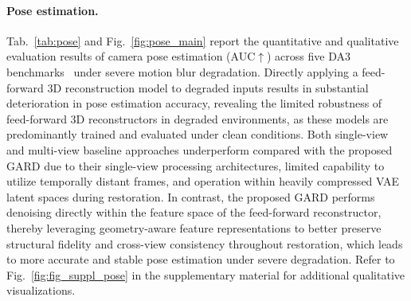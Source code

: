 \documentclass{llmxive}
\providecommand{\ourmodel}{GARD\xspace}
\begin{document}
\paragraph{Pose estimation.}
Tab.~\ref{tab:pose} and Fig.~\ref{fig:pose_main} report the quantitative and qualitative evaluation results of camera pose estimation (AUC$\uparrow$) across five DA3 benchmarks~\cite{depthanything3} under severe motion blur degradation. Directly applying a feed-forward 3D reconstruction model to degraded inputs results in substantial deterioration in pose estimation accuracy, revealing the limited robustness of feed-forward 3D reconstructors in degraded environments, as these models are predominantly trained and evaluated under clean conditions. Both single-view and multi-view baseline approaches underperform compared with the proposed GARD due to their single-view processing architectures, limited capability to utilize temporally distant frames, and operation within heavily compressed VAE latent spaces during restoration. In contrast, the proposed \ourmodel{} performs denoising directly within the feature space of the feed-forward reconstructor, thereby leveraging geometry-aware feature representations to better preserve structural fidelity and cross-view consistency throughout restoration, which leads to more accurate and stable pose estimation under severe degradation. Refer to Fig.~\ref{fig:fig_suppl_pose} in the supplementary material for additional qualitative visualizations.

\end{document}
